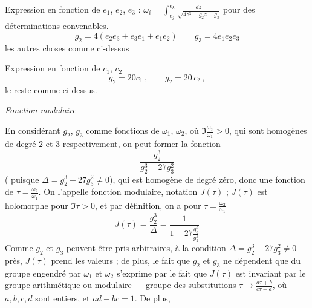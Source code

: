 \documentclass[11pt,a4paper]{article}
\begin{document}
Expression en fonction de $e_1$, $e_2$, $e_3$ :
$\omega_i = \int_{e_j}^{e_k}\frac{dz}{\sqrt{4z^3 - g_2 z - g_3}}$ pour des
déterminations convenables.
\[
g_2 = 4(e_2e_3 + e_3e_1 + e_1e_2) \qquad g_3 = 4e_1e_2e_3
\]
les autres choses comme ci-dessus

Expression en fonction de $c_1$, $c_2$
\[
g_2 = 20c_1\,, \qquad g_? = 20\,c_?\,,
\]
le reste comme ci-dessus.

\emph{Fonction modulaire}

En considérant $g_2$, $g_3$ comme fonctions de $\omega_1$, $\omega_2$, où
$\Im\frac{\omega_2}{\omega_1} > 0$, qui sont homogènes de degré $2$ et $3$
respectivement, on peut former la fonction
\[
\frac{g_2^3}{g_2^3 - 27g_3^2}
\]
( \ill{} puisque $\Delta = g_2^3 - 27g_3^2 \neq 0$), qui est
homogène de degré zéro, donc une fonction de $\tau = \frac{\omega_2}{\omega_1}$.
On l'appelle fonction modulaire, notation $J(\tau)$ ; $J(\tau)$ est holomorphe
pour $\Im\tau > 0$, et par définition, on a pour $\tau = \frac{\omega_2}{\omega_1}$
\[
J(\tau) = \frac{g_2^3}{\Delta} = \frac{1}{1 - 27\frac{g_3^2}{g_2^3}}
\]
Comme $g_2$ et $g_3$ peuvent être pris arbitraires, à \struck{\ill{}} la
condition $\Delta = g_2^3 - 27g_3^2 \neq 0$ près, $J(\tau)$ prend
\struck{\ill{}} les valeurs ; de plus, le fait que $g_2$ et $g_3$ ne dépendent
que du groupe engendré par $\omega_1$ et $\omega_2$ s'exprime par le fait que
$J(\tau)$ est invariant par le \struck{\ill{}} groupe arithmétique ou modulaire
--- groupe des substitutions $\tau\to\frac{a\tau+b}{c\tau+d}$, où $a,b,c,d$ sont
entiers, et $ad - bc = 1$. De plus,
\end{document}

